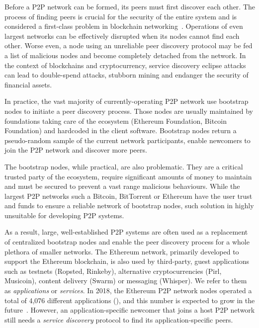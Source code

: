 Before a P2P network can be formed, its peers must first discover each other. The process of finding peers is crucial for the security of the entire system and is considered a first-class problem in blockchain networking~\cite{dotan2021survey}. Operations of even largest networks can be effectively disrupted when its nodes cannot find each other. Worse even, a node using an unreliable peer discovery protocol may be fed a list of malicious nodes and become completely detached from the network. In the context of blockchains and cryptocurrency, service discovery eclipse attacks can lead to double-spend attacks, stubborn mining and endanger the security of financial assets. 

In practice, the vast majority of currently-operating P2P network use bootstrap nodes to initiate a peer discovery process. Those nodes are usually maintained by foundations taking care of the ecosystem (\eg Ethereum Foundation, Bitcoin Foundation) and hardcoded in the client software. Bootstrap nodes return a pseudo-random sample of the current network participants, enable newcomers to join the P2P network and discover more peers. 

The bootstrap nodes, while practical, are also problematic. They are a critical trusted party of the ecosystem, require significant amounts of money to maintain and must be secured to prevent a vast range malicious behaviours. While the largest P2P networks such a Bitcoin, BitTorrent or Ethereum have the user trust and funds to ensure a reliable network of bootstrap nodes, such solution in highly unsuitable for developing P2P systems.

As a result, large, well-established P2P systems are often used as a replacement of centralized bootstrap nodes and enable the peer discovery process for a whole plethora of smaller networks. The Ethereum network, primarily developed to support the Ethereum blockchain, is also used by third-party, guest applications such as testnets (Ropsted, Rinkeby), alternative cryptocurrencies (Pirl, Musicoin), content delivery (Swarm) or messaging (Whisper). We refer to them as \emph{applications} or \emph{services}. In 2018, the Ethereum P2P network nodes operated a total of 4,076 different applications (), and this number is expected to grow in the future~\cite{kim2018measuring}. However, an application-specific newcomer that joins a host P2P network still needs a \emph{service discovery} protocol to find its application-specific peers. 

